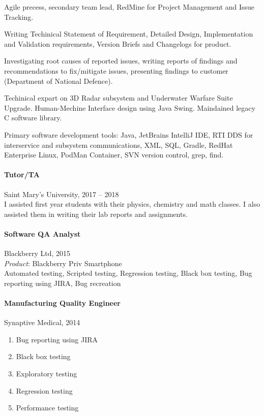 \documentclass[10pt, twocolumn]{article}
\begin{document}
Agile precess, secondary team lead, RedMine for Project Management and Issue Tracking.

Writing Techinical Statement of Requirement, Detailed Design, Implementation and Validation requirements, Version Briefs and Changelogs for product.

Investigating root causes of reported issues, writing reports of findings and recommendations to fix/mitigate issues, presenting findings to customer (Department of National Defence).

Techinical expart on 3D Radar subsystem and Underwater Warfare Suite Upgrade. Human-Mechine Interface design using Java Swing. Maindained legacy C software library.

Primary software development tools: Java, JetBrains IntelliJ IDE, RTI DDS for interservice and subsystem communications, XML, SQL, Gradle, RedHat Enterprise Linux, PodMan Container, SVN version control, grep, find.

\paragraph{Tutor/TA} Saint Mary's University, 2017 -- 2018\\
I assisted first year students with their physics, chemistry and math classes. I also assisted them in writing their lab reports and assignments.

\paragraph{Software QA Analyst} Blackberry Ltd, 2015\\
\emph{Product}: Blackberry Priv Smartphone\\
Automated testing,
Scripted testing,
Regression testing,
Black box testing,
Bug reporting using JIRA,
Bug recreation


\paragraph{Manufacturing Quality Engineer} Synaptive Medical, 2014\\
\begin{enumerate}
\item Bug reporting using JIRA
\item Black box testing
\item Exploratory testing
\item Regression testing
\item Performance testing
\end{enumerate}
\end{document}
